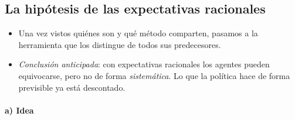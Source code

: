 \documentclass[11pt]{article}
\begin{document}
\begin{infografia}[H]
\centering
\caption{La nueva macroeconomía clásica en el tiempo}\label{figu:linea-tiempo-nmc}
\end{infografia}

\subsection{La hipótesis de las expectativas racionales}\label{sec:her}

\begin{itemize}
\item Una vez vistos quiénes son y qué método comparten, pasamos a la herramienta que los distingue de todos sus predecesores.
\item \emph{Conclusión anticipada}: con expectativas racionales los agentes pueden equivocarse, pero no de forma \emph{sistemática}. Lo que la política hace de forma previsible ya está descontado.
\end{itemize}

\paragraph{a) Idea}
\end{document}

